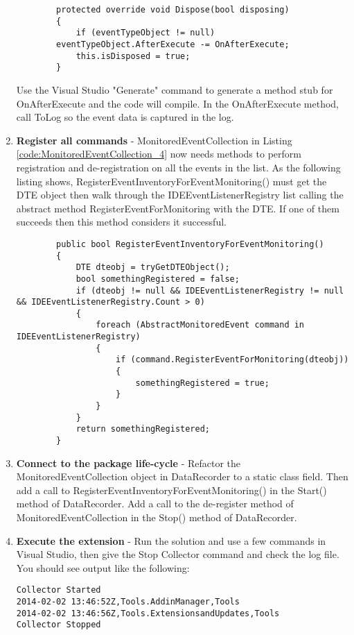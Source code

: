 \begin{enumerate}
\begin{lstlisting}
        protected override void Dispose(bool disposing)
        {
            if (eventTypeObject != null) 
		eventTypeObject.AfterExecute -= OnAfterExecute;
            this.isDisposed = true;
        }
\end{lstlisting}

Use the Visual Studio "Generate" command to generate a method stub for OnAfterExecute and the
code will compile.  In the OnAfterExecute method, call ToLog so the event data is captured in the log.

\item {\bf Register all commands} -  
MonitoredEventCollection in Listing \ref{code:MonitoredEventCollection_4} now needs methods to perform registration and de-registration on all the events in the list.  As the following listing shows, RegisterEventInventoryForEventMonitoring() must get the DTE object then walk through the IDEEventListenerRegistry list calling the abstract method RegisterEventForMonitoring with the DTE.  If one of them succeeds then this method considers it successful.

\begin{lstlisting}
        public bool RegisterEventInventoryForEventMonitoring()
        {
            DTE dteobj = tryGetDTEObject();
            bool somethingRegistered = false;
            if (dteobj != null && IDEEventListenerRegistry != null && IDEEventListenerRegistry.Count > 0)
            {
                foreach (AbstractMonitoredEvent command in IDEEventListenerRegistry)
                {
                    if (command.RegisterEventForMonitoring(dteobj))
                    {
                        somethingRegistered = true;
                    }
                }
            }
            return somethingRegistered;
        }
\end{lstlisting}


\item {\bf Connect to the package life-cycle} - 
Refactor the MonitoredEventCollection object in DataRecorder to a static class field.  Then add a call to RegisterEventInventoryForEventMonitoring() in the Start() method of DataRecorder.  Add a call to the de-register method of MonitoredEventCollection in the Stop() method of DataRecorder.  

\item {\bf Execute the extension} - 
Run the solution and use a few commands in Visual Studio, then give the Stop Collector command and check the log file.  You should see output like the following:
\begin{verbatim}
Collector Started
2014-02-02 13:46:52Z,Tools.AddinManager,Tools
2014-02-02 13:46:56Z,Tools.ExtensionsandUpdates,Tools
Collector Stopped
\end{verbatim}


\end{enumerate}


